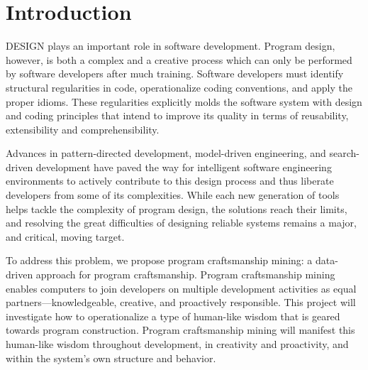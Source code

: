 \chapter{Introduction}{}
\label{sec:intro}

\lettrine[lraise=0.1, nindent=0em, slope=-.5em]{D}{ESIGN} plays an important 
role in software development. Program design, however, is both a complex and 
a creative process which can only be performed by software developers after 
much training. Software developers must identify structural regularities in 
code, operationalize coding conventions, and apply the proper idioms. These 
regularities explicitly molds the software system with design and coding
principles that intend to improve its quality in terms of reusability, extensibility
and comprehensibility.    

Advances in pattern-directed development, model-driven engineering, 
and search-driven development have paved the way for intelligent software engineering 
environments to actively contribute to this design process and thus liberate 
developers from some of its complexities. While each new generation of tools helps 
tackle the complexity of program design, the solutions reach their limits, and 
resolving the great difficulties of designing reliable systems remains a major, 
and critical, moving target.

To address this problem, we propose program craftsmanship mining: a data-driven 
approach for program craftsmanship. Program craftsmanship mining enables computers 
to join developers on multiple development activities as equal partners—knowledgeable, 
creative, and proactively responsible. This project will investigate how to operationalize 
a type of human-like wisdom that is geared towards program construction. Program craftsmanship 
mining will manifest this human-like wisdom throughout development, in creativity and 
proactivity, and within the system’s own structure and behavior. 

